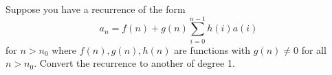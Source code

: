   Suppose you have a recurrence of the form
  \[
  a_n = f(n) + g(n) \sum_{i=0}^{n-1} h(i) a(i)
  \]
  for $n > n_0$ 
  where $f(n), g(n), h(n)$ are functions with $g(n) \neq 0$ for all $n > n_0$.
  Convert the recurrence to another of degree 1.
